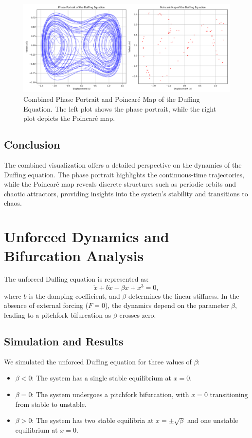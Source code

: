 \documentclass[11pt]{article}
\begin{document}
\begin{figure}[h!]
    \centering
    \includegraphics[width=\textwidth]{duffing_phase_and_poincare.png}
    \caption{Combined Phase Portrait and Poincaré Map of the Duffing Equation. The left plot shows the phase portrait, while the right plot depicts the Poincaré map.}
    \label{fig:duffing_phase_and_poincare}
\end{figure}

\subsection*{Conclusion}
The combined visualization offers a detailed perspective on the dynamics of the Duffing equation. The phase portrait highlights the continuous-time trajectories, while the Poincaré map reveals discrete structures such as periodic orbits and chaotic attractors, providing insights into the system's stability and transitions to chaos.

\section*{Unforced Dynamics and Bifurcation Analysis}
The unforced Duffing equation is represented as:
\[
\ddot{x} + b \dot{x} - \beta x + x^3 = 0,
\]
where \(b\) is the damping coefficient, and \(\beta\) determines the linear stiffness. In the absence of external forcing (\(F = 0\)), the dynamics depend on the parameter \(\beta\), leading to a pitchfork bifurcation as \(\beta\) crosses zero.

\subsection*{Simulation and Results}
We simulated the unforced Duffing equation for three values of \(\beta\):
\begin{itemize}
    \item \(\beta < 0\): The system has a single stable equilibrium at \(x = 0\).
    \item \(\beta = 0\): The system undergoes a pitchfork bifurcation, with \(x = 0\) transitioning from stable to unstable.
    \item \(\beta > 0\): The system has two stable equilibria at \(x = \pm\sqrt{\beta}\) and one unstable equilibrium at \(x = 0\).
\end{itemize}
\end{document}
